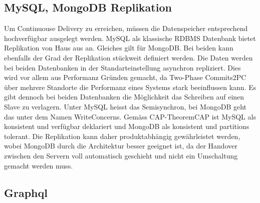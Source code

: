 \subsection{MySQL, MongoDB Replikation}

Um Continuouse Delivery zu erreichen, müssen die Datenspeicher entsprechend hochverfügbar ausgelegt werden. MySQL als klassische \Gls{RDBMS} Datenbank bietet Replikation von Haus aus an. Gleiches gilt für MongoDB. Bei beiden kann ebenfalls der Grad der Replikation stückweit definiert werden. Die Daten werden bei beiden Datenbanken in der Standarteinstellung asynchron repliziert. Dies wird vor allem aus Performanz Gründen gemacht, da Two-Phase Commits\Gls{2PC} über mehrere Standorte die Performanz eines Systems stark beeinflussen kann. Es gibt dennoch bei beiden Datenbanken die Möglichkeit das Schreiben auf einen Slave zu verlagern. Unter MySQL heisst das Semisynchron, bei MongoDB geht das unter dem Namen WriteConcerns. Gemäss CAP-Theorem\Gls{CAP} ist MySQL als konsistent und verfügbar deklariert und MongoDB als konsistent und partitions tolerant. Die Replikation kann daher produktabhängig gewährleistet werden, wobei MongoDB durch die Architektur besser geeignet ist, da der Handover zwischen den Servern voll automatisch geschieht und nicht ein Umschaltung gemacht werden muss.

\subsection{Graphql}

